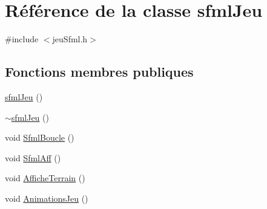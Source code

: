 \hypertarget{classsfml_jeu}{}\section{Référence de la classe sfml\+Jeu}
\label{classsfml_jeu}


{\ttfamily \#include $<$jeu\+Sfml.\+h$>$}

\subsection*{Fonctions membres publiques}
\begin{DoxyCompactItemize}
\item 
\hyperlink{classsfml_jeu_a9fc77ecdf5bae6cffe983027799732b4}{sfml\+Jeu} ()
\item 
\hyperlink{classsfml_jeu_a22446d3645360d379b963471e85eb989}{$\sim$sfml\+Jeu} ()
\item 
void \hyperlink{classsfml_jeu_aef827d63e16694a7c6c5dccdab4efd7d}{Sfml\+Boucle} ()
\item 
void \hyperlink{classsfml_jeu_a3082e40c284f965963cb46ed6c1aa2d8}{Sfml\+Aff} ()
\item 
void \hyperlink{classsfml_jeu_ab5cd077415351bbe0be57b5c3ec0230a}{Affiche\+Terrain} ()
\item 
void \hyperlink{classsfml_jeu_a5730343a4f374ce9d1af44707bcd7321}{Animations\+Jeu} ()
\end{DoxyCompactItemize}
